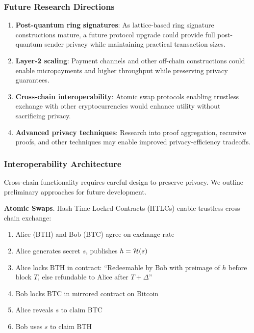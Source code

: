 \subsubsection{Future Research Directions}

\begin{enumerate}
  \item \textbf{Post-quantum ring signatures}: As lattice-based ring
    signature constructions mature, a future protocol upgrade could
    provide full post-quantum sender privacy while maintaining practical
    transaction sizes.

  \item \textbf{Layer-2 scaling}: Payment channels and other off-chain
    constructions could enable micropayments and higher throughput while
    preserving privacy guarantees.

  \item \textbf{Cross-chain interoperability}: Atomic swap protocols
    enabling trustless exchange with other cryptocurrencies would enhance
    utility without sacrificing privacy.

  \item \textbf{Advanced privacy techniques}: Research into proof
    aggregation, recursive proofs, and other techniques may enable
    improved privacy-efficiency tradeoffs.
\end{enumerate}

\subsubsection{Interoperability Architecture}

Cross-chain functionality requires careful design to preserve privacy.
We outline preliminary approaches for future development.

\textbf{Atomic Swaps}.
Hash Time-Locked Contracts (HTLCs) enable trustless cross-chain exchange:

\begin{enumerate}
  \item Alice (BTH) and Bob (BTC) agree on exchange rate
  \item Alice generates secret $s$, publishes $h = \mathcal{H}(s)$
  \item Alice locks BTH in contract: ``Redeemable by Bob with preimage of $h$
    before block $T$, else refundable to Alice after $T + \Delta$''
  \item Bob locks BTC in mirrored contract on Bitcoin
  \item Alice reveals $s$ to claim BTC
  \item Bob uses $s$ to claim BTH
\end{enumerate}

